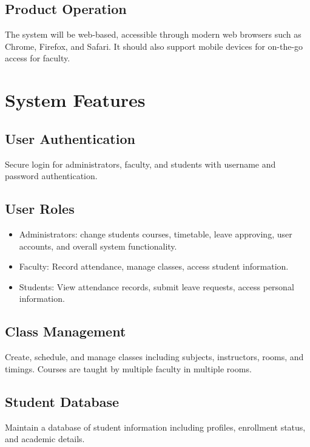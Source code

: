 \documentclass{article}
\begin{document}
\subsection*{\Large{Product Operation}}
\begin{large}
The system will be web-based, accessible through modern web browsers such as Chrome, Firefox, and Safari. It should also support mobile devices for on-the-go access for faculty.
\end{large}

\newpage
\section*{\huge{System Features}}

\subsection*{\Large{User Authentication}}
\begin{large}
Secure login for administrators, faculty, and students with username and password authentication.
\end{large}

\subsection*{\Large{User Roles}}
\begin{large}
\begin{itemize}[label={--}]
    \item Administrators: change students courses, timetable, leave approving, user accounts, and overall system functionality.
    \item Faculty: Record attendance, manage classes, access student information.
    \item Students: View attendance records, submit leave requests, access personal information.
\end{itemize}
\end{large}

\subsection*{\Large{Class Management}}
\begin{large}
Create, schedule, and manage classes including subjects, instructors, rooms, and timings. Courses are taught by multiple faculty in multiple rooms.
\end{large}

\subsection*{\Large{Student Database}}
\begin{large}
Maintain a database of student information including profiles, enrollment status, and academic details.
\end{large}
\end{document}
